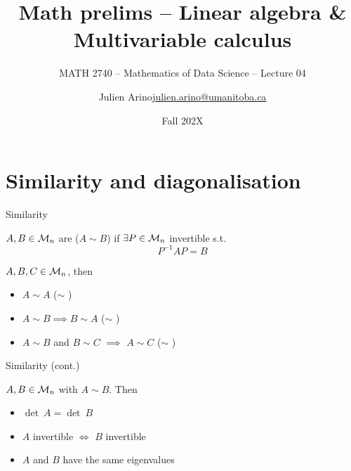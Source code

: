 \documentclass[aspectratio=169]{beamer}\usepackage[]{graphicx}\usepackage[]{xcolor}
\subtitle{MATH 2740 -- Mathematics of Data Science -- Lecture 04}
\author{\texorpdfstring{Julien Arino\newline\url{julien.arino@umanitoba.ca}}{Julien Arino}}
\institute{Department of Mathematics @ University of Manitoba}
\date{Fall 202X}
\title{Math prelims -- Linear algebra \& Multivariable calculus}
\begin{document}
\setcounter{theorem}{28}


\section{Similarity and diagonalisation}

\begin{frame}{Similarity}
\begin{definition}[Similarity]
$A,B\in\mathcal{M}_n$ are  ($A\sim B$) if $\exists P\in\mathcal{M}_n$ invertible s.t.
\[
P^{-1}AP=B
\]
\end{definition}
\vfill
\begin{theorem}
$A,B,C\in\mathcal{M}_n$, then
\begin{itemize}
	\item $A\sim A$ \hfill ($\sim$ )
	\item $A\sim B\implies B\sim A$ \hfill ($\sim$ )
	\item $A\sim B$ and $B\sim C$ $\implies$ $A\sim C$ \hfill ($\sim$ )
\end{itemize}
\end{theorem}
\end{frame}

\begin{frame}{Similarity (cont.)}
\begin{theorem}
$A,B\in\mathcal{M}_n$ with $A\sim B$. Then
\begin{itemize}
	\item $\det\ A=\det\ B$
	\item $A$ invertible $\iff$ $B$ invertible
	\item $A$ and $B$ have the same eigenvalues
\end{itemize}
\end{theorem}
\end{frame}
\end{document}
